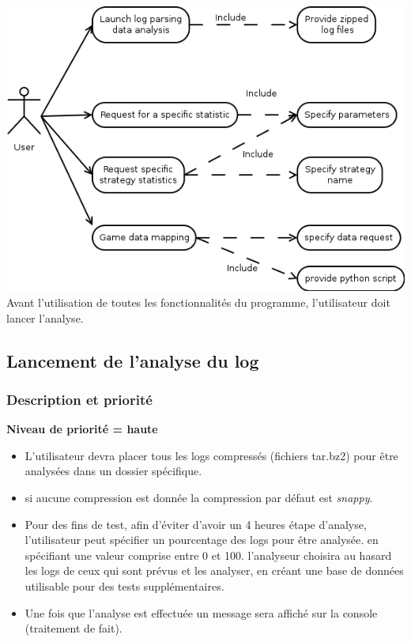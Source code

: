 \documentclass{scrreprt}
\begin{document}
\includegraphics[scale=0.45,keepaspectratio]{UseCaseParsing}\\
Avant l'utilisation de toutes les fonctionnalités du programme, l'utilisateur doit lancer l'analyse.
\subsection{Lancement de l'analyse du log}
\subsubsection{Description et priorité}
\textbf{Niveau de priorité = haute}\\
\begin{itemize}
  \item L'utilisateur devra placer tous les logs compressés (fichiers tar.bz2) pour être analysées dans un dossier spécifique.
  \item si aucune compression est donnée la compression par défaut est \textit{snappy}.
    \item Pour des fins de test, afin d'éviter d'avoir un 4 heures étape d'analyse, l'utilisateur peut spécifier un pourcentage des logs pour être analysée. en spécifiant une valeur comprise entre 0 et 100. l'analyseur choisira au hasard les logs de ceux qui sont prévus et les analyser, en créant une base de données utilisable pour des tests supplémentaires.
    \item Une fois que l'analyse est effectuée un message sera affiché sur la console (traitement de fait).

\end{itemize}
\end{document}
